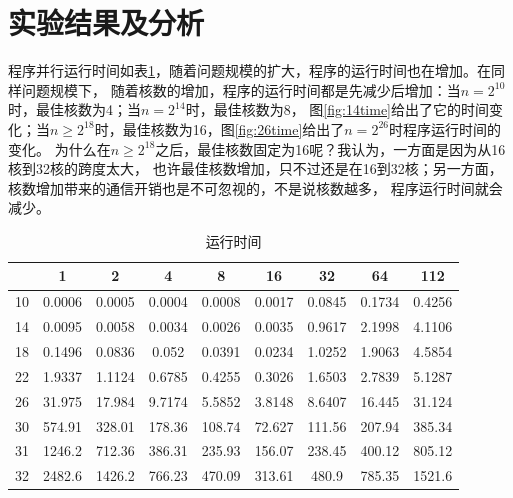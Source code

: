 \documentclass[10pt,letterpaper]{ctexart}
\newcommand{\figref}[1]{图\ref{#1}}
\newcommand{\tabref}[1]{表\ref{#1}}
\begin{document}
\section{实验结果及分析}
程序并行运行时间如\tabref{tab:time}，随着问题规模的扩大，程序的运行时间也在增加。在同样问题规模下，
随着核数的增加，程序的运行时间都是先减少后增加：当$n=2^{10}$时，最佳核数为4；当$n=2^{14}$时，最佳核数为8，
\figref{fig:14time}给出了它的时间变化；当$n \geq 2^{18}$时，最佳核数为16，\figref{fig:26time}给出了$n=2^{26}$时程序运行时间的变化。
为什么在$n \geq 2^{18}$之后，最佳核数固定为16呢？我认为，一方面是因为从16核到32核的跨度太大，
也许最佳核数增加，只不过还是在16到32核；另一方面，核数增加带来的通信开销也是不可忽视的，不是说核数越多，
程序运行时间就会减少。

\begin{table}[!htbp]
    \centering
    \begin{tabular}{c|cccccccc}
        \toprule
            & 1 & 2 & 4 & 8 & 16 & 32 & 64 & 112\\
        \hline
        10 & 0.0006 & 0.0005 & 0.0004 & 0.0008 & 0.0017 & 0.0845 & 0.1734 & 0.4256\\
        14 & 0.0095 & 0.0058 & 0.0034 & 0.0026 & 0.0035 & 0.9617 & 2.1998 & 4.1106\\
        18 & 0.1496 & 0.0836 & 0.052 & 0.0391 & 0.0234 & 1.0252 & 1.9063 & 4.5854\\
        22 & 1.9337 & 1.1124 & 0.6785 & 0.4255 & 0.3026 & 1.6503 & 2.7839 & 5.1287\\
        26 & 31.975 & 17.984 & 9.7174 & 5.5852 & 3.8148 & 8.6407 &16.445 & 31.124\\
        30 & 574.91 & 328.01 & 178.36 & 108.74 & 72.627 & 111.56 & 207.94 & 385.34\\
        31 & 1246.2 & 712.36 & 386.31 & 235.93 & 156.07 & 238.45 & 400.12 & 805.12\\
        32 & 2482.6 & 1426.2 & 766.23 & 470.09 & 313.61 & 480.9 & 785.35 & 1521.6        \\
        \bottomrule
    \end{tabular}
    \caption{运行时间} \label{tab:time}
\end{table}

\begin{figure}[H]
  \centering
\end{figure}
\end{document}
